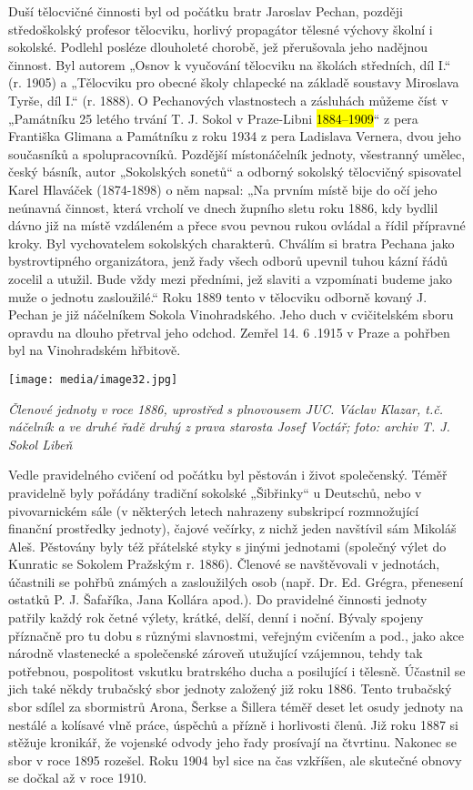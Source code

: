 Duší tělocvičné činnosti byl od počátku bratr Jaroslav Pechan, později
středoškolský profesor tělocviku, horlivý propagátor tělesné výchovy
školní i sokolské. Podlehl posléze dlouholeté chorobě, jež přerušovala
jeho nadějnou činnost. Byl autorem „Osnov k vyučování tělocviku na
školách středních, díl I.`` (r. 1905) a „Tělocviku pro obecné školy
chlapecké na základě soustavy Miroslava Tyrše, díl I.`` (r. 1888). O
Pechanových vlastnostech a zásluhách můžeme číst v „Památníku 25 letého
trvání T. J. Sokol v Praze-Libni \hl{1884--⁠⁠⁠⁠⁠⁠1909}`` z pera Františka
Glimana a Památníku z roku 1934 z pera Ladislava Vernera, dvou jeho
současníků a spolupracovníků. Pozdější místonáčelník jednoty, všestranný
umělec, český básník, autor „Sokolských sonetů`` a odborný sokolský
tělocvičný spisovatel Karel Hlaváček (1874-1898) o něm napsal: „Na
prvním místě bije do očí jeho neúnavná činnost, která vrcholí ve dnech
župního sletu roku 1886, kdy bydlil dávno již na místě vzdáleném a přece
svou pevnou rukou ovládal a řídil přípravné kroky. Byl vychovatelem
sokolských charakterů. Chválím si bratra Pechana jako bystrovtipného
organizátora, jenž řady všech odborů upevnil tuhou kázní řádů zocelil a
utužil. Bude vždy mezi předními, jež slaviti a vzpomínati budeme jako
muže o jednotu zasloužilé.`` Roku 1889 tento v tělocviku odborně kovaný
J. Pechan je již náčelníkem Sokola Vinohradského. Jeho duch v
cvičitelském sboru opravdu na dlouho přetrval jeho odchod. Zemřel 14. 6
.1915 v Praze a pohřben byl na Vinohradském hřbitově.

\texttt{[image: media/image32.jpg]}

\emph{Členové jednoty v roce 1886, uprostřed s plnovousem JUC. Václav
Klazar, t.č. náčelník a ve druhé řadě druhý z prava starosta Josef
Voctář; foto: archiv T. J. Sokol Libeň}

Vedle pravidelného cvičení od počátku byl pěstován i život společenský.
Téměř pravidelně byly pořádány tradiční sokolské „Šibřinky`` u Deutschů,
nebo v pivovarnickém sále (v některých letech nahrazeny subskripcí
rozmnožující finanční prostředky jednoty), čajové večírky, z nichž jeden
navštívil sám Mikoláš Aleš. Pěstovány byly též přátelské styky s jinými
jednotami (společný výlet do Kunratic se Sokolem Pražským r. 1886).
Členové se navštěvovali v jednotách, účastnili se pohřbů známých a
zasloužilých osob (např. Dr. Ed. Grégra, přenesení ostatků P. J.
Šafaříka, Jana Kollára apod.). Do pravidelné činnosti jednoty patřily
každý rok četné výlety, krátké, delší, denní i noční. Bývaly spojeny
příznačně pro tu dobu s různými slavnostmi, veřejným cvičením a pod.,
jako akce národně vlastenecké a společenské zároveň utužující vzájemnou,
tehdy tak potřebnou, pospolitost vskutku bratrského ducha a posilující i
tělesně. Účastnil se jich také někdy trubačský sbor jednoty založený již
roku 1886. Tento trubačský sbor sdílel za sbormistrů Arona, Šerkse a
Šillera téměř deset let osudy jednoty na nestálé a kolísavé vlně práce,
úspěchů a přízně i horlivosti členů. Již roku 1887 si stěžuje kronikář,
že vojenské odvody jeho řady prosívají na čtvrtinu. Nakonec se sbor v
roce 1895 rozešel. Roku 1904 byl sice na čas vzkříšen, ale skutečné
obnovy se dočkal až v roce 1910.

